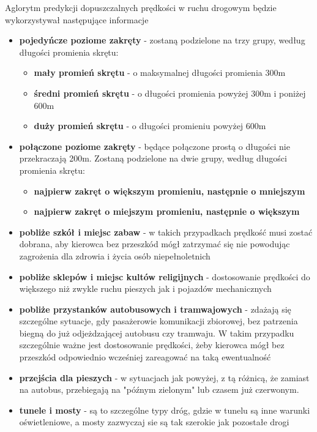 Aglorytm predykcji dopuszczalnych prędkości w ruchu drogowym będzie wykorzystywał następujące informacje

\begin{itemize}
\item \textbf{pojedyńcze poziome zakręty} - zostaną podzielone na trzy grupy, według długości promienia skrętu:
 \begin{itemize}
 	\item \textbf{mały promień skrętu} - o maksymalnej długości promienia 300m
 	\item \textbf{średni promień skrętu} - o długości promienia powyżej 300m i poniżej 600m
 	\item \textbf{duży promień skrętu} - o długości promieniu powyżej 600m 
 \end{itemize}
\item \textbf{połączone poziome zakręty} - będące połączone prostą o długości nie przekraczają 200m. Zostaną podzielone na dwie grupy, według długości promienia skrętu:
 \begin{itemize}
 	\item \textbf{najpierw zakręt o większym promieniu, następnie o mniejszym}
 	\item \textbf{najpierw zakręt o miejszym promieniu, następnie o większym}
 \end{itemize}
\item \textbf{pobliże szkół i miejsc zabaw} - w takich przypadkach prędkość musi zostać dobrana, aby kierowca bez przeszkód mógł zatrzymać się nie powodując zagrożenia dla zdrowia i życia osób niepełnoletnich
\item \textbf{pobliże sklepów i miejsc kultów religijnych} - dostosowanie prędkości do większego niż zwykle ruchu pieszych jak i pojazdów mechanicznych
\item \textbf{pobliże przystanków autobusowych i tramwajowych} - zdażają się szczególne sytuacje, gdy pasażerowie komunikacji zbiorowej, bez patrzenia biegną  do już odjeżdzającej autobusu czy tramwaju. W takim przypadku szczególnie ważne jest dostosowanie prędkości, żeby kierowca mógł bez przeszkód odpowiednio wcześniej zareagować na taką ewentualność
\item \textbf{przejścia dla pieszych} - w sytuacjach jak powyżej, z tą różnicą, że zamiast na autobus, przebiegają na "późnym zielonym" lub czasem już czerwonym.
\item \textbf{tunele i mosty} - są to szczególne typy dróg, gdzie w tunelu są inne warunki oświetleniowe, a mosty zazwyczaj sie są tak szerokie jak pozostałe drogi

\end{itemize}
